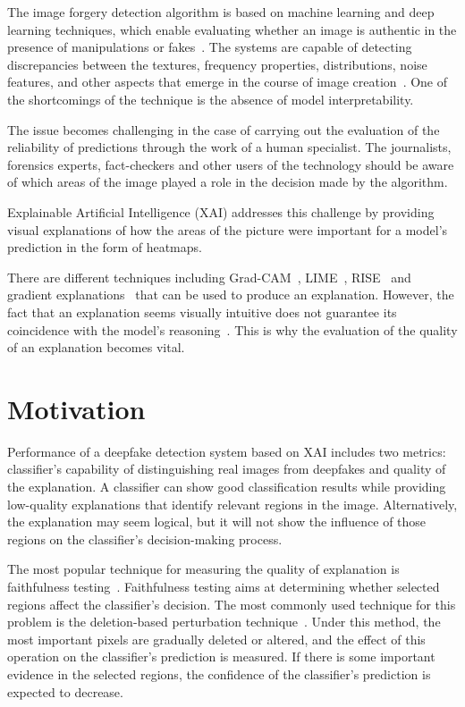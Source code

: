 \documentclass[12pt,a4wide]{report}
\theoremstyle{plain}
\theoremstyle{definition}
\theoremstyle{remark}
\begin{document}
The image forgery detection algorithm is based on machine learning and deep learning techniques, which enable evaluating whether an image is authentic in the presence of manipulations or fakes~\cite{wang2020cnn, ojha2023univfd, corvi2023diffusion, wang2023dire, yan2023deepfakebench}. The systems are capable of detecting discrepancies between the textures, frequency properties, distributions, noise features, and other aspects that emerge in the course of image creation~\cite{zhang2019autogan, frank2020frequency, durall2020upconv}. One of the shortcomings of the technique is the absence of model interpretability.

The issue becomes challenging in the case of carrying out the evaluation of the reliability of predictions through the work of a human specialist. The journalists, forensics experts, fact-checkers and other users of the technology should be aware of which areas of the image played a role in the decision made by the algorithm. 

Explainable Artificial Intelligence (XAI) addresses this challenge by providing visual explanations of how the areas of the picture were important for a model's prediction in the form of heatmaps.

There are different techniques including Grad-CAM~\cite{selvaraju2017gradcam}, LIME~\cite{ribeiro2016lime}, RISE~\cite{petsiuk2018rise} and gradient explanations~\cite{simonyan2014saliency} that can be used to produce an explanation. However, the fact that an explanation seems visually intuitive does not guarantee its coincidence with the model's reasoning~\cite{adebayo2018sanity}. This is why the evaluation of the quality of an explanation becomes vital.


\section{Motivation}
\label{sec:motivation}

Performance of a deepfake detection system based on XAI includes two metrics: classifier's capability of distinguishing real images from deepfakes and quality of the explanation. A classifier can show good classification results while providing low-quality explanations that identify relevant regions in the image. Alternatively, the explanation may seem logical, but it will not show the influence of those regions on the classifier's decision-making process.


The most popular technique for measuring the quality of explanation is faithfulness testing~\cite{hedstrom2023quantus}. Faithfulness testing aims at determining whether selected regions affect the classifier's decision. The most commonly used technique for this problem is the deletion-based perturbation technique~\cite{samek2017evaluating, petsiuk2018rise}. Under this method, the most important pixels are gradually deleted or altered, and the effect of this operation on the classifier's prediction is measured. If there is some important evidence in the selected regions, the confidence of the classifier's prediction is expected to decrease.
\end{document}
